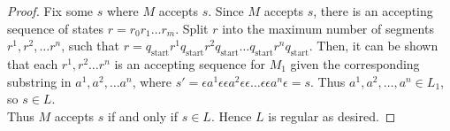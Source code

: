 \documentclass{article}
\begin{document}
\begin{proof}
    \noindent
    Fix some $s$ where $M$ accepts $s$. Since $M$ accepts $s$, there is an accepting sequence of states $r = r_0 r_1 \ldots r_{m}$. Split $r$ into the maximum 
    number of segments $r^1, r^2, \ldots r^n$, such that 
    $r = q_{\text{start}} r^1 q_{\text{start}} r^2 q_{\text{start}} \ldots q_{\text{start}} r^n q_{\text{start}}$. Then, it can be shown that each 
    $r^1, r^2 \ldots r^n$ is an accepting sequence for $M_1$ given the corresponding substring in $a^1, a^2, \ldots a^n$, where 
    $s' = \epsilon a^1 \epsilon \epsilon a^2 \epsilon \epsilon \ldots \epsilon \epsilon a^n \epsilon = s$. Thus $a^1, a^2, \ldots, a^n \in L_1$, so $s \in L$. \\

    \noindent
    Thus $M$ accepts $s$ if and only if $s \in L$. Hence $L$ is regular as desired.
\end{proof}
\end{document}
